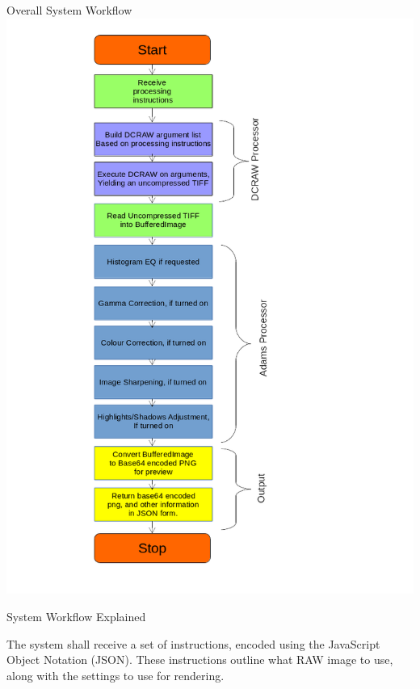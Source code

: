 \documentclass[final]{beamer}
\begin{document}
\begin{frame}{}
\begin{columns}[t]
\begin{column}{.48\linewidth}
        \begin{block}{Overall System Workflow}
          \includegraphics[width=\columnwidth]{DesignSystemandGA}
        \end{block}
        \begin{block}{System Workflow Explained}

          The system shall receive a set of instructions, encoded using the JavaScript
          Object Notation (JSON). These instructions outline what RAW image to use, along with
          the settings to use for rendering.


\end{block}
\end{column}
\end{columns}
\end{frame}
\end{document}
